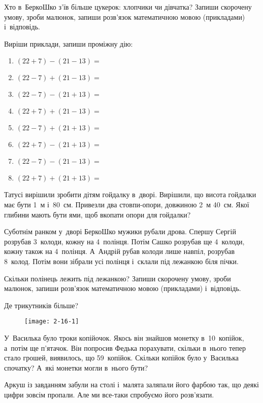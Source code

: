 Хто в~БеркоШко з’їв більше цукерок: хлопчики чи дівчатка?
Запиши скорочену умову, зроби малюнок, запиши розв’язок
математичною мовою (прикладами) і~відповідь.


\problem
Виріши приклади, запиши проміжну дію:
\begin{multicols}{2}
    \begin{enumerate}
        \item $(22 + 7) - (21 - 13) =$
        \item $(22 - 7) + (21 - 13) =$
        \item $(22 - 7) - (21 + 13) =$
        \item $(22 + 7) + (21 - 13) =$
        \item $(22 - 7) + (21 + 13) =$
        \item $(22 + 7) - (21 + 13) =$
        \item $(22 - 7) - (21 - 13) =$
        \item $(22 + 7) + (21 + 13) =$
    \end{enumerate}
\end{multicols}


\problem
Татусі вирішили зробити дітям гойдалку в~дворі.
Вирішили, що висота гойдалки має бути 1~м і~80~см.
Привезли два стовпи-опори, довжиною 2~м 40~см.
Якої глибини мають бути ями, щоб вкопати опори для гойдалки?


\problem
Суботнім ранком у~дворі БеркоШко мужики рубали дрова.
Спершу Сергій розрубав 3~колоди, кожну на 4~полінця.
Потім Сашко розрубав ще 4~колоди, кожну також на 4~полінця.
А~Андрій рубав колоди лише навпіл, розрубав 8~колод.
Потім вони зібрали усі полінця і~склали під лежанкою біля пічки.

Скільки полінець лежить під лежанкою?
Запиши скорочену умову, зроби малюнок,
запиши розв’язок математичною мовою (прикладами) і~відповідь.


\problem
Де трикутників більше?

\begin{figure}[h]
    \centering
    \texttt{[image: 2-16-1]}
\end{figure}


\problem
У~Василька було троки копійочок.
Якось він знайшов монетку в~10~копійок, а~потім ще п’ятачок.
Він попросив Федька порахувати, скільки в~нього тепер стало грошей,
виявилось, що 59~копійок.
Скільки копійок було у~Василька спочатку?
А~які монетки могли в~нього бути? 


\problem
Аркуш із завданням забули на столі і~малята заляпали його фарбою так,
що деякі цифри зовсім пропали.
Але ми все-таки спробуємо його розв’язати.

